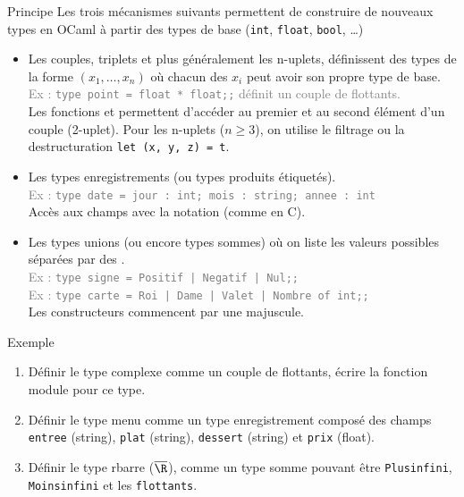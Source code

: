 \documentclass[10pt]{beamer}
\begin{document}
\begin{frame}{\Ctitle}{\stitle}
	\begin{block}{Principe}
		Les trois mécanismes suivants permettent de construire de nouveaux types en OCaml à partir des types de base ({\tt int}, {\tt float}, {\tt bool}, \dots)
		\begin{itemize}
			\item<2-> Les couples, triplets et plus généralement les n-uplets, définissent des types de la forme $(x_1,\dots,x_n)$ où chacun des $x_i$ peut avoir son propre type de base. \\
				\onslide<3->\textcolor{gray}{Ex : \texttt{type point = float * float;;} définit un couple de flottants.}\\
				\onslide<4->Les fonctions  et  permettent d'accéder au premier et au second élément d'un couple (2-uplet). Pour les n-uplets ($n \ge 3$), on utilise le filtrage ou la destructuration \texttt{let (x, y, z) = t}.
			\item<5-> Les types enregistrements (ou types produits étiquetés).\\
				\onslide<6->\textcolor{gray}{Ex : \texttt{type date = {jour : int; mois : string; annee : int}}}\\
				\onslide<7-> Accès aux champs avec la notation  (comme en C).
			\item<8-> Les types unions (ou encore types sommes) où on liste les valeurs possibles séparées par des \kw{|}. \\
				\onslide<9->\textcolor{gray}{Ex : \texttt{type signe = Positif | Negatif | Nul;;}}\\
				\onslide<10->\textcolor{gray}{Ex : \texttt{type carte = Roi | Dame | Valet | Nombre of int;;}}\\
				\onslide<11->\textcolor{BrickRed}{\small \danger \;} Les constructeurs commencent par une majuscule.
		\end{itemize}
	\end{block}
\end{frame}

\begin{frame}{\Ctitle}{\stitle}
	\begin{exampleblock}{Exemple}
		\begin{enumerate}
			\item<1-> Définir le type complexe comme un couple de flottants, écrire la fonction module pour ce type.
			\item<2-> Définir le type menu comme un type enregistrement composé des champs {\tt entree} (string), {\tt plat} (string), {\tt dessert} (string) et {\tt prix} (float).
			\item<3-> Définir le type rbarre ($\overline{\R}$), comme un type somme pouvant être {\tt Plusinfini}, {\tt Moinsinfini} et les {\tt flottants}.
		\end{enumerate}
	\end{exampleblock}
\end{frame}
\end{document}
